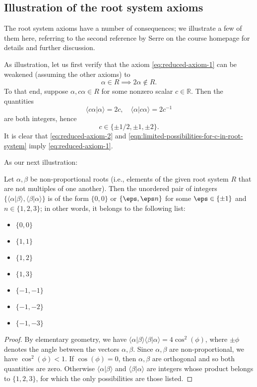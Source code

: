 \documentclass[reqno]{amsart} 
\begin{document}
\subsection{Illustration of the root system axioms}
\label{sec:org44a29a8}
The root system axioms have a number of consequences; we illustrate a few of them here, referring to the second reference by Serre on the course homepage for details and further discussion.

As illustration, let us first verify that the axiom \eqref{eq:reduced-axiom-1} can be weakened (assuming the other axioms) to
\begin{equation}\label{eq:reduced-axiom-2}
  \alpha \in R \implies 2 \alpha \notin R.
\end{equation}
To that end, suppose $\alpha, c \alpha \in R$ for some nonzero scalar $c \in \mathbb{R}$.  Then the quantities
\begin{equation*}
  \langle c \alpha | \alpha \rangle = 2 c, \quad \langle \alpha | c \alpha \rangle = 2 c^{-1}
\end{equation*}
are both integers, hence
\begin{equation}\label{eqn:limited-possibilities-for-c-in-root-system}
  c \in \{\pm 1/2, \pm 1, \pm 2\}.
\end{equation}
It is clear that \eqref{eq:reduced-axiom-2} and \eqref{eqn:limited-possibilities-for-c-in-root-system} imply \eqref{eq:reduced-axiom-1}.

As our next illustration:
\begin{lemma}
  \label{lem:possibilities-for-inner-products-roots}
  Let $\alpha,\beta$ be non-proportional roots (i.e., elements of the given root system $R$ that are not multiples of one another).  Then the unordered pair of integers $\{\langle \alpha|\beta \rangle, \langle \beta|\alpha \rangle\}$ is of the form $\{0,0\}$ or $\{\eps, \eps n\}$ for some $\eps \in \{\pm 1\}$ and $n \in \{1,2,3\}$; in other words, it belongs to the following list:
  \begin{itemize}
  \item $\{0,0\}$
  \item $\{1,1\}$
  \item $\{1,2\}$
  \item $\{1,3\}$
  \item $\{-1,-1\}$
  \item $\{-1,-2\}$
  \item $\{-1,-3\}$
  \end{itemize}
\end{lemma}
\begin{proof}
  By elementary geometry, we have $\langle \alpha |\beta \rangle \langle \beta | \alpha \rangle = 4 \cos^2(\phi)$, where $\pm \phi$ denotes the angle between the vectors $\alpha,\beta$.  Since $\alpha,\beta$ are non-proportional, we have $\cos^2(\phi) < 1$.  If $\cos(\phi) = 0$, then $\alpha,\beta$ are orthogonal and so both quantities are zero.  Otherwise $\langle \alpha|\beta \rangle$ and $\langle \beta|\alpha \rangle$ are integers whose product belongs to $\{1,2,3\}$, for which the only possibilities are those listed.
\end{proof}
\end{document}
